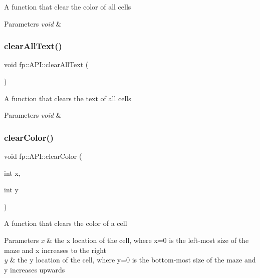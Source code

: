 A function that clear the color of all cells 
\begin{DoxyParams}{Parameters}
{\em void} & \\
\hline
\end{DoxyParams}
\mbox{\label{classfp_1_1_a_p_i_ae0b4d27428aad11e98647b88947f2c34}} 
\subsubsection{\texorpdfstring{clear\+All\+Text()}{clearAllText()}}
{\footnotesize\ttfamily void fp\+::\+A\+P\+I\+::clear\+All\+Text (\begin{DoxyParamCaption}{ }\end{DoxyParamCaption})\hspace{0.3cm}{\ttfamily [static]}}

A function that clears the text of all cells 
\begin{DoxyParams}{Parameters}
{\em void} & \\
\hline
\end{DoxyParams}
\mbox{\label{classfp_1_1_a_p_i_a5ab1560f68fb54993c8b3316177040a5}} 
\subsubsection{\texorpdfstring{clear\+Color()}{clearColor()}}
{\footnotesize\ttfamily void fp\+::\+A\+P\+I\+::clear\+Color (\begin{DoxyParamCaption}\item[{int}]{x,  }\item[{int}]{y }\end{DoxyParamCaption})\hspace{0.3cm}{\ttfamily [static]}}

A function that clears the color of a cell 
\begin{DoxyParams}{Parameters}
{\em x} & the x location of the cell, where x=0 is the left-\/most size of the maze and x increases to the right \\
\hline
{\em y} & the y location of the cell, where y=0 is the bottom-\/most size of the maze and y increases upwards \\
\hline
\end{DoxyParams}
\mbox{\label{classfp_1_1_a_p_i_a0b23c3b22476d1826987b93b518010d1}} 
